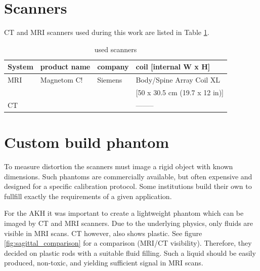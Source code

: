 \documentclass[parskip,bibtotoc,final,twoside=false,titlepage,a4paper,english,12pt,titlepage,a4paper]{scrbook}
\begin{document}

\section{Scanners}

CT and MRI scanners used during this work are listed in Table \ref{tab:scanners}.

\begin{table}[h]
\centering
\begin{tabular}{llll}
System	& product name	& company	& coil [internal W x H]		\\
\toprule
MRI	& Magnetom C!	& Siemens	& Body/Spine Array Coil XL	\\
	&		&		& [50 x 30.5 cm (19.7 x 12 in)]	\\
CT	&		&		& --------
\end{tabular}
\caption{used scanners}
\label{tab:scanners}
\end{table}

\section{Custom build phantom}

To measure distortion the scanners must image a rigid object with known dimensions.
Such phantoms are commercially available, but often expensive and designed for a specific calibration protocol.
Some institutions build their own to fullfill exactly the requirements of a given application.

For the AKH it was important to create a lightweight phantom which can be imaged by CT and MRI scanners.
Due to the underlying physics, only fluids are visible in MRI scans. CT however, also shows plastic.
See figure \ref{fig:sagittal_comparison} for a comparison (MRI/CT visibility).
Therefore, they decided on plastic rods with a suitable fluid filling.
Such a liquid should be easily produced, non-toxic, and yielding sufficient signal in MRI scans.
\end{document}
